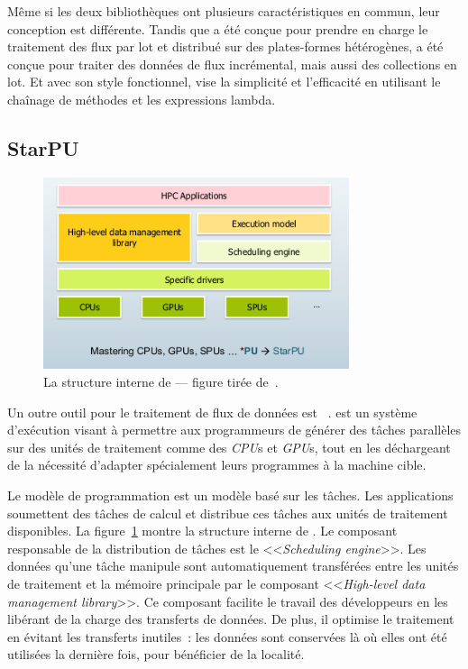 M\^eme si les deux biblioth\`eques ont plusieurs caract\'eristiques en commun, leur conception est diff\'erente. Tandis que  a \'et\'e conçue pour prendre en charge le traitement des flux par lot et distribu\'e sur des plates-formes h\'et\'erog\`enes,  a \'et\'e conçue pour traiter des donn\'ees de flux incr\'emental, mais aussi des collections en lot. Et avec son style fonctionnel,  vise la simplicit\'e et l'efficacit\'e en utilisant le cha\^inage de m\'ethodes et les expressions {lambda}.



\subsection{StarPU} 
\label{starpu.sect}

\begin{figure}
\centering
     \includegraphics[width=0.8\textwidth]{Figures/StarPUInternalStructure.png}
      \caption[La structure interne de .]{ La structure interne de  --- figure tir\'ee de~\citep{starPuRuntime}.}
       \label{StarPUInternalStructure.fig}
\end{figure}


Un outre outil pour le traitement de flux de donn\'ees est ~\citep{starPuReferenceEnLigne}.   est un syst\`eme d'ex\'ecution visant \`a permettre aux programmeurs de g\'en\'erer des t\^aches parall\`eles sur des unit\'es de traitement comme  des \emph{CPU}s et \emph{GPU}s, tout en les d\'echargeant de la n\'ecessit\'e d'adapter sp\'ecialement leurs programmes \`a la machine cible.


Le mod\`ele de programmation  est un mod\`ele bas\'e sur les t\^aches. Les applications soumettent des t\^aches de calcul et  distribue ces t\^aches aux unit\'es de traitement disponibles. La figure~\ref{StarPUInternalStructure.fig} montre la structure interne de . Le composant responsable de la distribution de t\^aches est le <<\emph{Scheduling engine}>>. Les donn\'ees qu'une t\^ache manipule sont automatiquement transf\'er\'ees entre les unit\'es de traitement et la m\'emoire principale par le composant <<\emph{High-level data management library}>>. Ce composant facilite le travail des d\'eveloppeurs en les lib\'erant de la charge des transferts de donn\'ees. De plus, il optimise le traitement en \'evitant les transferts inutiles~: les donn\'ees sont conserv\'ees l\`a o\`u elles ont été utilisées la derni\`ere fois, pour bénéficier de la localité.

